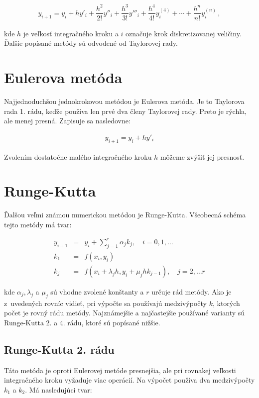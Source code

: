 \begin{eqnarray}
y_{i + 1} = y_{i} + h y'_{i} + \dfrac{h^{2}}{2!}y''_{i} + \dfrac{h^{3}}{3!}y'''_{i} + \dfrac{h^{4}}{4!}y^{(4)}_{i} + \cdots + \dfrac{h^{n}}{n!}y_{i}^{(n)} \, , \label{Taylor}
\end{eqnarray}

kde $ h $ je veľkosť integračného kroku a $ i $ označuje krok diskretizovanej veličiny. Ďalšie popísané metódy sú odvodené od Taylorovej rady.


\section{Eulerova metóda}
Najjednoduchšou jednokrokovou metódou je Eulerova metóda. Je to Taylorova rada 1. rádu, keďže používa len prvé dva členy Taylorovej rady. Preto je rýchla, ale menej presná. Zapisuje sa nasledovne:

\begin{eqnarray}
y_{i+1} = y_{i} + hy'_{i}
\end{eqnarray}

Zvolením dostatočne malého integračného kroku $ h $ môžeme zvýšiť jej presnosť.


\section{Runge-Kutta}
Ďalšou veľmi známou numerickou metódou je Runge-Kutta. Všeobecná schéma tejto metódy má tvar:

\begin{eqnarray}
y_{i+1} & = & y_{i} + \sum^{r}_{j=1} \alpha_{j}k_{j} , \quad i=0, 1,\dotsc \\
k_{1} & = & f(x_{i},y_{i}) \nonumber \\
k_{j} & = & f(x_{i} + \lambda_{j}h, y_{i} + \mu_{j}hk_{j-1}) , \quad j=2,\dotsc r \nonumber
\end{eqnarray}

kde $\alpha_{j}, \lambda_{j}$ a $\mu_{j}$ sú vhodne zvolené konštanty a $ r $ určuje rád metódy. Ako je z~uvedených rovníc vidieť, pri výpočte sa používajú medzivýpočty $ k $, ktorých počet je rovný rádu metódy.
Najznámejšie a najčastejšie používané varianty sú Runge-Kutta 2. a 4. rádu, ktoré sú popísané nižšie.

\subsection{Runge-Kutta 2. rádu} \label{RK2}
Táto metóda je oproti Eulerovej metóde presnejšia, ale pri rovnakej veľkosti integračného kroku vyžaduje viac operácií. Na výpočet používa dva medzivýpočty $ k_{1} $ a $ k_{2} $. Má nasledujúci tvar:

